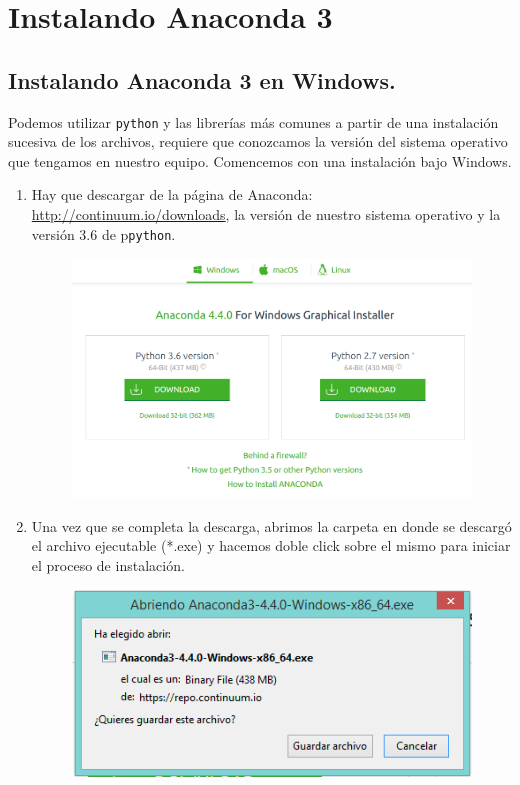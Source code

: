 \documentclass[12pt]{article}
\begin{document}
\section{Instalando Anaconda 3}
\subsection{Instalando Anaconda 3 en Windows.}
Podemos utilizar \texttt{python} y las librerías más comunes a partir de una instalación sucesiva de los archivos, requiere que conozcamos la versión del sistema operativo que tengamos en nuestro equipo. Comencemos con una instalación bajo Windows.
\begin{enumerate}
\item Hay que descargar de la página de Anaconda: \url{http://continuum.io/downloads}, la versión de nuestro sistema operativo y la versión 3.6 de p\texttt{python}.
\begin{figure}[H]
	\centering
	\includegraphics[scale=0.5]{Imagenes/Instalacion_Anaconda_Windows_01} 
\end{figure}
\item Una vez que se completa la descarga, abrimos la carpeta en donde se descargó el archivo ejecutable (*.exe) y hacemos doble click sobre el mismo para iniciar el proceso de instalación.
\begin{figure}[H]
	\centering
	\includegraphics[scale=0.5]{Imagenes/Instalacion_Anaconda_Windows_02}

\end{figure}
\end{enumerate}
\end{document}
